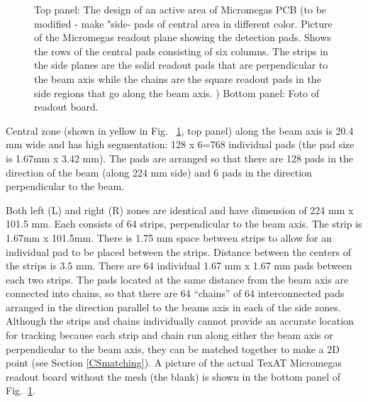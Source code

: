 \documentclass[final,number,sort&compress,5p,times,twocolumn]{elsarticle}
\begin{document}
\begin{figure}[hbt!]
    \caption{Top panel: The design of an active area of Micromegas PCB (to be modified - make "side- pads of central area in different color. {Picture of the Micromegas readout plane showing the detection pads. Shows the rows of the central pads consisting of six columns. The strips in the side planes are the solid readout pads that are perpendicular to the beam axis while the chains are the square readout pads in the side regions that go along the beam axis.} )
        Bottom panel: Foto of readout board. }
        \label{fig:MMBoardLayout}
\end{figure}

Central zone (shown in yellow in Fig. ~\ref{fig:MMBoardLayout}, top panel) along the beam axis is 20.4 mm wide and has high segmentation: 128 x 6=768 individual pads (the pad size is 1.67mm x 3.42 mm). The pads are arranged so that there are 128 pads in the direction of the beam (along 224 mm side) and 6 pads in the direction perpendicular to the beam.

Both left (L) and right (R) zones are identical and have dimension of 224 mm x 101.5 mm. Each consists of 64 strips, perpendicular to the beam axis. The strip is 1.67mm  x 101.5mm. There is 1.75 mm space between strips to allow for an individual pad to be placed between the strips. Distance between the centers of the strips is 3.5 mm. There are 64 individual 1.67 mm  x 1.67 mm pads between each two strips. The pads located at the same distance from the beam axis are connected into chains, so that there are 64 ``chains'' of 64 interconnected pads arranged in the direction parallel to the beams axis in each of the side zones. Although the strips and chains individually cannot provide an accurate location for tracking because each strip and chain run along either the beam axis or perpendicular to the beam axis, they can be matched together to make a 2D point (see Section \ref{CSmatching}). A picture of the actual TexAT Micromegas readout board without the mesh (the blank) is shown in the bottom panel of Fig.~\ref{fig:MMBoardLayout}.
	
\end{document}
